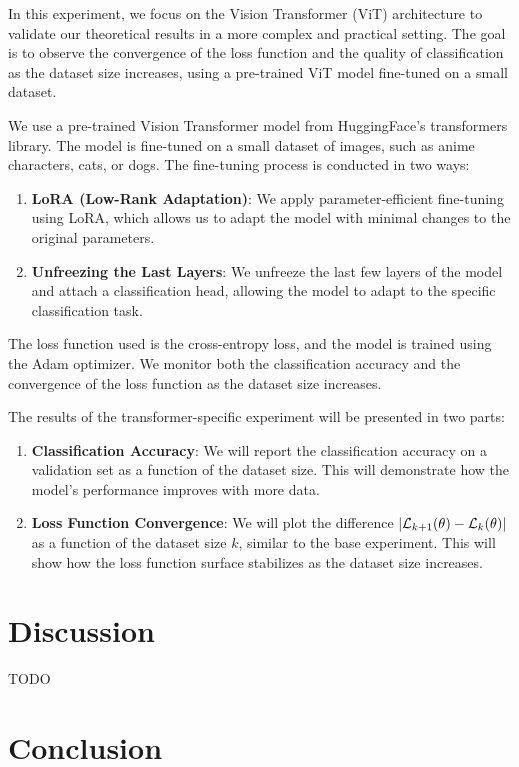 \documentclass{article}
\begin{document}
In this experiment, we focus on the Vision Transformer (ViT) architecture to validate our theoretical results in a more complex and practical setting. The goal is to observe the convergence of the loss function and the quality of classification as the dataset size increases, using a pre-trained ViT model fine-tuned on a small dataset.

We use a pre-trained Vision Transformer model from HuggingFace's transformers library. The model is fine-tuned on a small dataset of images, such as anime characters, cats, or dogs. The fine-tuning process is conducted in two ways:
\begin{enumerate}
\item \textbf{LoRA (Low-Rank Adaptation)}: We apply parameter-efficient fine-tuning using LoRA, which allows us to adapt the model with minimal changes to the original parameters.
\item \textbf{Unfreezing the Last Layers}: We unfreeze the last few layers of the model and attach a classification head, allowing the model to adapt to the specific classification task.
\end{enumerate}

The loss function used is the cross-entropy loss, and the model is trained using the Adam optimizer. We monitor both the classification accuracy and the convergence of the loss function as the dataset size increases.

The results of the transformer-specific experiment will be presented in two parts:
\begin{enumerate}
\item \textbf{Classification Accuracy}: We will report the classification accuracy on a validation set as a function of the dataset size. This will demonstrate how the model's performance improves with more data.
\item \textbf{Loss Function Convergence}: We will plot the difference 
$|\mathcal{L}_{k + 1}(\theta) - \mathcal{L}_{k}(\theta)|$ as a function of the dataset size $k$, similar to the base experiment. This will show how the loss function surface stabilizes as the dataset size increases.
\end{enumerate}

\section{Discussion}\label{sec:disc}

TODO

\section{Conclusion}\label{sec:concl}
\end{document}
